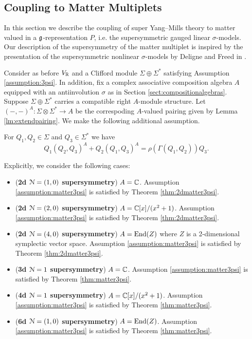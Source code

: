 \documentclass[10pt, oneside]{article}
\begin{document}
\subsection{Coupling to Matter Multiplets}
\label{sect:mattermultipletSUSY}

In this section we describe the coupling of super Yang--Mills theory to matter valued in a $\mathfrak g$-representation $P$, i.e. the supersymmetric gauged linear $\sigma$-models. Our description of the supersymmetry of the matter multiplet is inspired by the presentation of the supersymmetric nonlinear $\sigma$-models by Deligne and Freed in \cite[Chapter 3]{DeligneFreed}.

Consider as before $V_\mathbb R$ and a Clifford module $\Sigma\oplus \Sigma^*$ satisfying Assumption \ref{assumption:3psi}. In addition, fix a complex associative composition algebra $A$ equipped with an antiinvolution $\sigma$ as in Section \ref{sect:compositionalgebras}. Suppose $\Sigma\oplus \Sigma^*$ carries a compatible right $A$-module structure. Let $(-, -)^A\colon \Sigma\otimes \Sigma^*\rightarrow A$ be the correspoding $A$-valued pairing given by Lemma \ref{lm:extendpairing}. We make the following additional assumption.

\begin{assumption}
For $Q_1, Q_2\in\Sigma$ and $Q_3\in\Sigma^*$ we have
\[Q_1(Q_2, Q_3)^A + Q_2(Q_1, Q_3)^A = \rho(\Gamma(Q_1, Q_2))Q_3.\]
\label{assumption:matter3psi}
\end{assumption}

Explicitly, we consider the following cases:
\begin{itemize}
\item (\textbf{2d $\mathcal N=(1, 0)$ supersymmetry}) $A = \mathbb C$. Assumption \ref{assumption:matter3psi} is satisfied by Theorem \ref{thm:2dmatter3psi}.

\item (\textbf{2d $\mathcal N=(2, 0)$ supersymmetry}) $A = \mathbb C[x]/(x^2+1)$. Assumption \ref{assumption:matter3psi} is satisfied by Theorem \ref{thm:2dmatter3psi}.

\item (\textbf{2d $\mathcal N=(4, 0)$ supersymmetry}) $A = \operatorname{End}(Z)$ where $Z$ is a 2-dimensional symplectic vector space. Assumption \ref{assumption:matter3psi} is satisfied by Theorem \ref{thm:2dmatter3psi}.

\item (\textbf{3d $\mathcal N=1$ supersymmetry}) $A = \mathbb C$. Assumption \ref{assumption:matter3psi} is satisfied by Theorem \ref{thm:matter3psi}.

\item (\textbf{4d $\mathcal N=1$ supersymmetry}) $A = \mathbb C[x]/(x^2+1)$. Assumption \ref{assumption:matter3psi} is satisfied by Theorem \ref{thm:matter3psi}.

\item (\textbf{6d $\mathcal N=(1, 0)$ supersymmetry}) $A = \operatorname{End}(Z)$. Assumption \ref{assumption:matter3psi} is satisfied by Theorem \ref{thm:matter3psi}.
\end{itemize}
\end{document}
